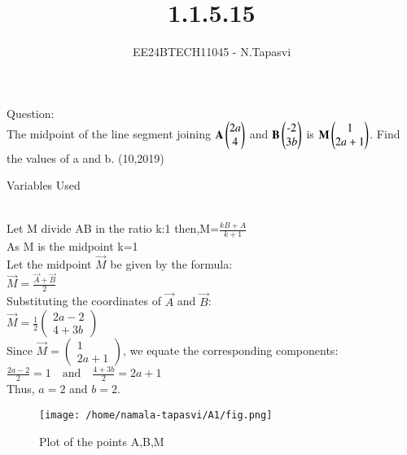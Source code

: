 \documentclass[journal]{IEEEtran}
\begin{document}

\vspace{3cm}

\title{1.1.5.15}
\author{EE24BTECH11045 - N.Tapasvi}
{\let\newpage\relax\maketitle}
Question:\\
The midpoint of the line segment joining $\mathbf{A}\begin{pmatrix}2a\\4\end{pmatrix}$ and $\mathbf{B}\begin{pmatrix}\text{-}2\\3b\end{pmatrix}$ is $\mathbf{M}\begin{pmatrix}1\\2a+1\end{pmatrix}$. Find the values of a and b.
\hfill (10,2019)

\solution
\begin{table}[h!]    
  \centering
  
  \caption{Variables Used}
  \label{tab1-1.5-15}
\end{table}\\

Let M divide AB in the ratio k:1
then,M=$\frac{kB+A}{k+1}$\\

As M is the midpoint k=1\\

Let the midpoint $\vec{M}$ be given by the formula:\\

$\vec{M} = \frac{\vec{A} + \vec{B}}{2}$\\

Substituting the coordinates of $\vec{A}$ and $\vec{B}$:\\

$\vec{M} = \frac{1}{2} \begin{pmatrix} 2a - 2 \\ 4 + 3b \end{pmatrix}$\\

Since $\vec{M} = \begin{pmatrix} 1 \\ 2a+1 \end{pmatrix}$, we equate the corresponding components:\\

$\frac{2a - 2}{2} = 1 \quad \text{and} \quad \frac{4 + 3b}{2} = 2a + 1$\\

Thus, $a = 2$ and $b = 2$.


\begin{figure}[h!]
   \centering
	\texttt{[image: /home/namala-tapasvi/A1/fig.png]}
   \caption{Plot of the points A,B,M}
   \label{stemplot}
\end{figure}
\end{document}
